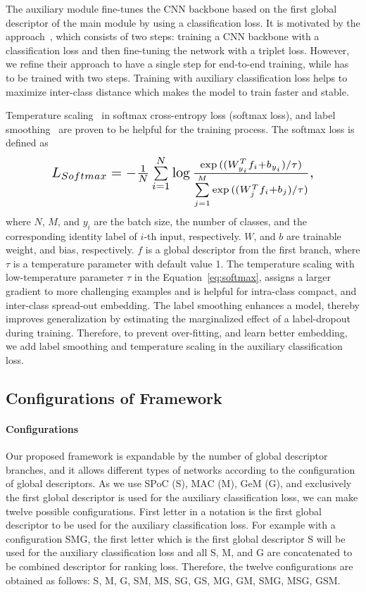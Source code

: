 \documentclass[10pt,twocolumn,letterpaper]{article}
\begin{document}
\begin{CJK}{UTF8}{mj}
The auxiliary module fine-tunes the CNN backbone based on the first global descriptor of the main module by using a classification loss.
It is motivated by the approach~\cite{gordo2017end}, which consists of two steps: training a CNN backbone with a classification loss and then fine-tuning the network with a triplet loss.
However, we refine their approach to have a single step for end-to-end training, while \cite{gordo2017end} has to be trained with two steps.
Training with auxiliary classification loss helps to maximize inter-class distance which makes the model to train faster and stable.


Temperature scaling~\cite{guo2017calibration, zhang2018Heated} in softmax cross-entropy loss (softmax loss), and label smoothing~\cite{szegedy2016rethinking} are proven to be helpful for the training process.
The softmax loss is defined as
\begin{equation} \label{eq:softmax}
\resizebox{.8\hsize}{!}{
    $L_{Softmax} = -{1 \over N} \sum\limits_{i=1}^N \log{ \exp{((W_{y_i}^T {f_i} + b_{y_i})/\tau)} \over {\sum\limits_{j=1}^M{\exp{((W_{j}^T {f_i} + {b_j})/\tau)}}} },$
}
\end{equation}
where $N$, $M$, and $y_i$ are the batch size, the number of classes, and the corresponding identity label of $i$-th input, respectively.
$W$, and $b$ are trainable weight, and bias, respectively.
$f$ is a global descriptor from the first branch, where $\tau$ is a temperature parameter with default value 1.
The temperature scaling with low-temperature parameter $\tau$ in the Equation~\ref{eq:softmax}, assigns a larger gradient to more challenging examples and is helpful for intra-class compact, and inter-class spread-out embedding.
The label smoothing enhances a model, thereby improves generalization by estimating the marginalized effect of a label-dropout during training.
Therefore, to prevent over-fitting, and learn better embedding, we add label smoothing and temperature scaling in the auxiliary classification loss.

\subsection{Configurations of Framework} \label{sec:configurations_of_framework}
\paragraph{Configurations}
Our proposed framework is expandable by the number of global descriptor branches, and it allows different types of networks according to the configuration of global descriptors.
As we use SPoC (S), MAC (M), GeM (G), and exclusively the first global descriptor is used for the auxiliary classification loss, we can make twelve possible configurations.
First letter in a notation is the first global descriptor to be used for the auxiliary classification loss.
For example with a configuration SMG, the first letter which is the first global descriptor S will be used for the auxiliary classification loss and all S, M, and G are concatenated to be combined descriptor for ranking loss.
Therefore, the twelve configurations are obtained as follows: S, M, G, SM, MS, SG, GS, MG, GM, SMG, MSG, GSM.


\end{CJK}
\end{document}

